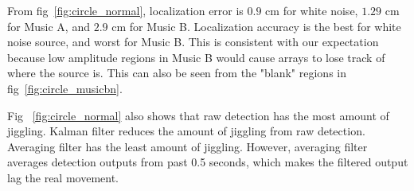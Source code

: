 From fig~\ref{fig:circle_normal}, localization error is $0.9$ cm for white noise, $1.29$ cm for Music A, and $2.9$ cm for Music B. Localization accuracy is the best for white noise source, and worst for Music B. This is consistent with our expectation because low amplitude regions in Music B would cause arrays to lose track of where the source is. This can also be seen from the "blank" regions in fig~\ref{fig:circle_musicbn}.

Fig ~\ref{fig:circle_normal} also shows that raw detection has the most amount of jiggling. Kalman filter reduces the amount of jiggling from raw detection. Averaging filter has the least amount of jiggling. However, averaging filter averages detection outputs from past 0.5 seconds, which makes the filtered output lag the real movement. 

